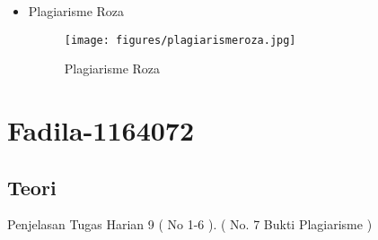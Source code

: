 \begin{itemize}
\item Plagiarisme Roza
\begin{figure}[!hbtp]
\centering
\texttt{[image: figures/plagiarismeroza.jpg]}
\caption{Plagiarisme Roza}
\label{text-fadila}
\end{figure}
\end{itemize}


\par
\par
\par
\par
\par
\section{Fadila-1164072}
\subsection{Teori}
Penjelasan Tugas Harian 9 ( No 1-6 ). ( No. 7 Bukti Plagiarisme )
